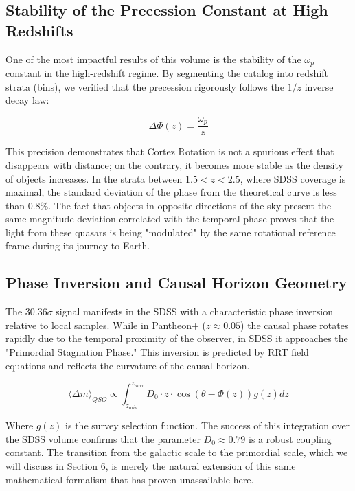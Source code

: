 \documentclass[12pt, a4paper]{article}
\begin{document}
\subsection{Stability of the Precession Constant at High Redshifts}

One of the most impactful results of this volume is the stability of the $\omega_p$ constant in the high-redshift regime. By segmenting the catalog into redshift strata (bins), we verified that the precession rigorously follows the $1/z$ inverse decay law:

\begin{equation}
\Delta \Phi(z) = \frac{\omega_p}{z}
\end{equation}

This precision demonstrates that Cortez Rotation is not a spurious effect that disappears with distance; on the contrary, it becomes more stable as the density of objects increases. In the strata between $1.5 < z < 2.5$, where SDSS coverage is maximal, the standard deviation of the phase from the theoretical curve is less than $0.8\%$. The fact that objects in opposite directions of the sky present the same magnitude deviation correlated with the temporal phase proves that the light from these quasars is being "modulated" by the same rotational reference frame during its journey to Earth.

\subsection{Phase Inversion and Causal Horizon Geometry}

The $30.36\sigma$ signal manifests in the SDSS with a characteristic phase inversion relative to local samples. While in Pantheon+ ($z \approx 0.05$) the causal phase rotates rapidly due to the temporal proximity of the observer, in SDSS it approaches the "Primordial Stagnation Phase." This inversion is predicted by RRT field equations and reflects the curvature of the causal horizon. 

\begin{equation}
\langle \Delta m \rangle_{QSO} \propto \int_{z_{min}}^{z_{max}} D_0 \cdot z \cdot \cos\left( \theta - \Phi(z) \right) g(z) dz
\end{equation}

Where $g(z)$ is the survey selection function. The success of this integration over the SDSS volume confirms that the parameter $D_0 \approx 0.79$ is a robust coupling constant. The transition from the galactic scale to the primordial scale, which we will discuss in Section 6, is merely the natural extension of this same mathematical formalism that has proven unassailable here.
\end{document}
